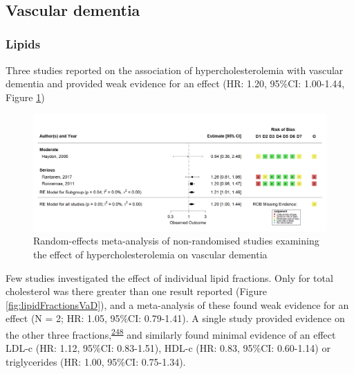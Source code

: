 \documentclass[a4paper, twoside]{templates/ociamthesis}
\begin{document}
~

\hypertarget{sys-rev-res-VaD}{%
\subsection{Vascular dementia}\label{sys-rev-res-VaD}}

\hypertarget{lipids-2}{%
\subsubsection{Lipids}\label{lipids-2}}

Three studies reported on the association of hypercholesterolemia with vascular dementia and provided weak evidence for an effect (HR: 1.20, 95\%CI: 1.00-1.44, Figure \ref{fig:obsHyperVaD})





\begin{figure}[H]
\includegraphics[width=1\linewidth]{figures/sys-rev/fp_obs_hyperchol_VaD} \caption[Meta-analysis of hypercholesterolemia on vascular dementia]{Random-effects meta-analysis of non-randomised studies examining the effect of hypercholesterolemia on vascular dementia}\label{fig:obsHyperVaD}
\end{figure}

Few studies investigated the effect of individual lipid fractions. Only for total cholesterol was there greater than one result reported (Figure \ref{fig:lipidFractionsVaD}), and a meta-analysis of these found weak evidence for an effect (N = 2; HR: 1.05, 95\%CI: 0.79-1.41). A single study provided evidence on the other three fractions,\textsuperscript{\protect\hyperlink{ref-yoshitake1995}{248}} and similarly found minimal evidence of an effect LDL-c (HR: 1.12, 95\%CI: 0.83-1.51), HDL-c (HR: 0.83, 95\%CI: 0.60-1.14) or triglycerides (HR: 1.00, 95\%CI: 0.75-1.34).
\end{document}
